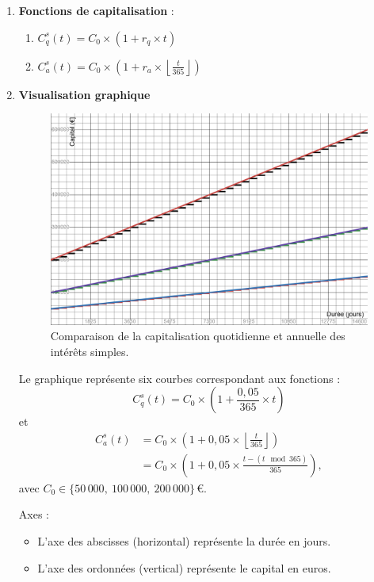 \documentclass{article}
\begin{document}
\begin{enumerate}[label=\textbf{Q\arabic*.}]
    \item \textbf{Fonctions de capitalisation} :
    \begin{enumerate}[label=(\alph*)]
        \item \( C_q^s(t) = C_0 \times \left(1 + r_q \times t\right) \)
        \item \( C_a^s(t) = C_0 \times \left(1 + r_a \times \left\lfloor\frac{t}{365}\right\rfloor\right) \)
    \end{enumerate}

    \item \textbf{Visualisation graphique}
    \begin{figure}[h!]
        \centering
        \includegraphics[width=\textwidth]{interets_simples.png}
        \caption{Comparaison de la capitalisation quotidienne et annuelle des intérêts simples.}
        \label{fig:capitalisation}
    \end{figure}

    Le graphique représente six courbes correspondant aux fonctions :
        \[
            C_q^s(t) = C_0 \times \left(1 + \frac{0{,}05}{365} \times t\right)
        \]
        et
        \[
        \begin{aligned}
            C_a^s(t) &= C_0 \times \left(1 + 0{,}05 \times \left\lfloor\frac{t}{365}\right\rfloor\right) \\
                     &= C_0 \times \left(1 + 0{,}05 \times \frac{t - (t \!\!\!\mod 365)}{365}\right),
        \end{aligned}
        \]
        avec \( C_0 \in \bigl\{50\,000,\ 100\,000,\ 200\,000\bigr\}\,\text{€} \).

    Axes :
    \begin{itemize}
        \item L'axe des abscisses (horizontal) représente la durée en jours.
        \item L'axe des ordonnées (vertical) représente le capital en euros.
    \end{itemize}


\end{enumerate}
\end{document}
